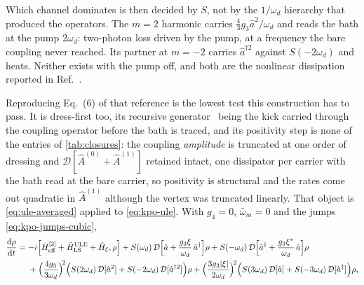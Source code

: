 \documentclass[a4paper,11pt]{article}
\newcommand{\Dcal}{\mathcal{D}}
\newcommand{\eff}{\mathrm{eff}}
\begin{document}
\begin{example}
Which channel dominates is then decided by $S$, not by the $1/\omega_d$ hierarchy that produced the operators. The $m=2$ harmonic carries $\tfrac43 g_3\hat a^2/\omega_d$ and reads the bath at the pump $2\omega_d$: two-photon loss driven by the pump, at a frequency the bare coupling never reached. Its partner at $m=-2$ carries $\hat a^{\dagger2}$ against $S(-2\omega_d)$ and heats. Neither exists with the pump off, and both are the nonlinear dissipation reported in Ref.~\cite{Venkatraman2024Nonlinear}.

Reproducing Eq.~(6) of that reference is the lowest test this construction has to pass. It is dress-first too, its recursive generator~\cite{VenkatramanStatic2022} being the kick carried through the coupling operator before the bath is traced, and its positivity step is none of the entries of \cref{tab:closures}: the coupling \emph{amplitude} is truncated at one order of dressing and $\Dcal[\hat A^{(0)}+\hat A^{(1)}]$ retained intact, one dissipator per carrier with the bath read at the bare carrier, so positivity is structural and the rates come out quadratic in $\hat A^{(1)}$ although the vertex was truncated linearly. That object is \eqref{eq:ule-averaged} applied to \eqref{eq:kpo-ule}. With $g_4=0$, $\bar\omega_m=0$ and the jumps \eqref{eq:kpo-jumps-cubic},
\begin{equation}\label{eq:kpo-averaged}
  \begin{aligned}
    \dv{\rho}{t} = {}&{-i}\comm{H_\eff^{[2]} + \bar H^{\mathrm{ULE}}_{\mathrm{LS}} + \hat H_\xi}{\rho}
    + S(\omega_d)\,\Dcal\Big[\hat a + \frac{g_3\xi}{\omega_d}\,\hat a^\dagger\Big]\rho
    + S(-\omega_d)\,\Dcal\Big[\hat a^\dagger + \frac{g_3\xi^*}{\omega_d}\,\hat a\Big]\rho\\
    &+ \Big(\frac{4g_3}{3\omega_d}\Big)^{\!2}\Big(S(2\omega_d)\,\Dcal[\hat a^2]
      + S(-2\omega_d)\,\Dcal[\hat a^{\dagger2}]\Big)\rho
    + \Big(\frac{3g_3\lvert\xi\rvert}{2\omega_d}\Big)^{\!2}\Big(S(3\omega_d)\,\Dcal[\hat a]
      + S(-3\omega_d)\,\Dcal[\hat a^\dagger]\Big)\rho ,
  \end{aligned}
\end{equation}

\end{example}
\end{document}
